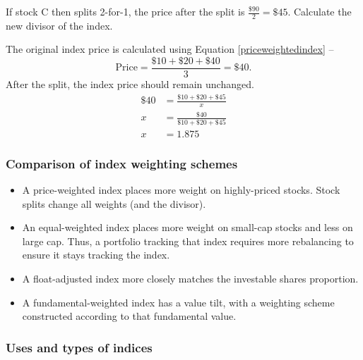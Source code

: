 \documentclass[../notes_compiled.tex]{subfiles}
\begin{document}
\begin{itemize}
{If stock C then splits 2-for-1, the price after the split is $\frac{\$90}{2}=\$45$. Calculate the new divisor of the index.
}
{\color{RoyalBlue}
\item[]The original index price is calculated using Equation \ref{priceweightedindex} -- 
\begin{equation}
\text{Price} = \frac{\$10 + \$20 + \$40}{3} = \$40.
\end{equation}
After the split, the index price should remain unchanged.
\begin{align*}
\$40 &= \frac{\$10 + \$20 + \$45}{x}  \\
x &= \frac{\$40}{\$10 + \$20 + \$45} \\
x &= 1.875
\end{align*}
}
\end{itemize}




\subsubsection{Comparison of index weighting schemes}
\begin{itemize}
\item A price-weighted index places more weight on highly-priced stocks. Stock splits change all weights (and the divisor).
\item An equal-weighted index places more weight on small-cap stocks and less on large cap. Thus, a portfolio tracking that index requires more rebalancing to ensure it stays tracking the index.
\item A float-adjusted index more closely matches the investable shares proportion.
\item A fundamental-weighted index has a value tilt, with a weighting scheme constructed according to that fundamental value.
\end{itemize}

\subsubsection{Uses and types of indices}
\end{document}
